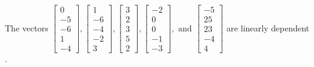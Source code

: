 \begin{exercise}
\begin{exerciseStatement}
  \end{exerciseStatement}
  \begin{exerciseAnswer}
   The vectors \(\left[\begin{array}{r}
0 \\
-5 \\
-6 \\
1 \\
-4
\end{array}\right] , \left[\begin{array}{r}
1 \\
-6 \\
-4 \\
-2 \\
3
\end{array}\right] , \left[\begin{array}{r}
3 \\
2 \\
3 \\
5 \\
2
\end{array}\right] , \left[\begin{array}{r}
-2 \\
0 \\
0 \\
-1 \\
-3
\end{array}\right] , \text{ and } \left[\begin{array}{r}
-5 \\
25 \\
23 \\
-4 \\
4
\end{array}\right]\) are 
  	 linearly dependent  .
  


  \end{exerciseAnswer}
\end{exercise}